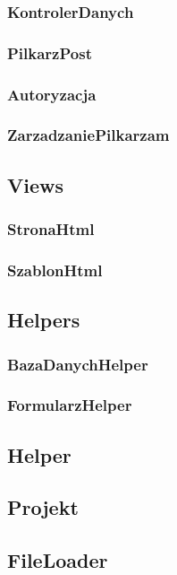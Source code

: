        \subsubsection{KontrolerDanych}
        \subsubsection{PilkarzPost}
        \subsubsection{Autoryzacja}
        \subsubsection{ZarzadzaniePilkarzam}

    \subsection{Views}
        \subsubsection{StronaHtml}
        \subsubsection{SzablonHtml}

    \subsection{Helpers}
        \subsubsection{BazaDanychHelper}
        \subsubsection{FormularzHelper}
        
    \subsection{Helper}
    \subsection{Projekt}
          

    \subsection{FileLoader}